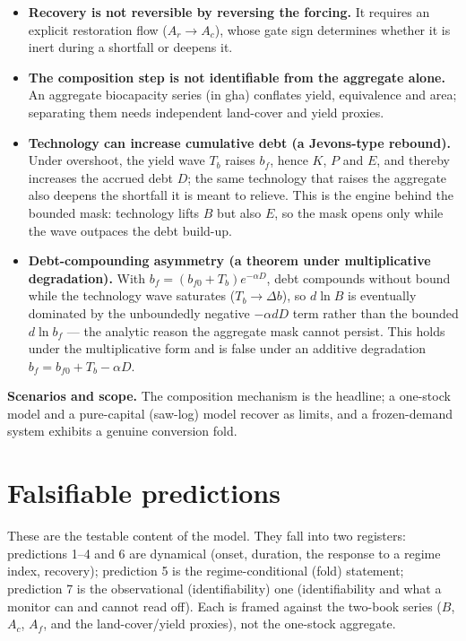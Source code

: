 \documentclass[11pt]{article}
\begin{document}
\begin{itemize}
\item \textbf{Recovery is not reversible by reversing the forcing.} It requires an explicit restoration flow ($A_r\to A_c$), whose gate sign determines whether it is inert during a shortfall or deepens it.
\item \textbf{The composition step is not identifiable from the aggregate alone.} An aggregate biocapacity series (in gha) conflates yield, equivalence and area; separating them needs independent land-cover and yield proxies.
\item \textbf{Technology can increase cumulative debt (a Jevons-type rebound).} Under overshoot, the yield wave $T_b$ raises $b_f$, hence $K$, $P$ and $E$, and thereby increases the accrued debt $D$; the same technology that raises the aggregate also deepens the shortfall it is meant to relieve. This is the engine behind the bounded mask: technology lifts $B$ but also $E$, so the mask opens only while the wave outpaces the debt build-up.
\item \textbf{Debt-compounding asymmetry (a theorem under multiplicative degradation).} With $b_f=(b_{f0}+T_b)e^{-\alpha D}$, debt compounds without bound while the technology wave saturates ($T_b\to\Delta b$), so $d\ln B$ is eventually dominated by the unboundedly negative $-\alpha dD$ term rather than the bounded $d\ln b_f$ --- the analytic reason the aggregate mask cannot persist. This holds under the multiplicative form and is false under an additive degradation $b_f=b_{f0}+T_b-\alpha D$.
\end{itemize}

\noindent\textbf{Scenarios and scope.} The composition mechanism is the headline; a one-stock model and a pure-capital (saw-log) model recover as limits, and a frozen-demand system exhibits a genuine conversion fold.

\section{Falsifiable predictions}

These are the testable content of the model. They fall into two registers: predictions 1--4 and 6 are dynamical (onset, duration, the response to a regime index, recovery); prediction 5 is the regime-conditional (fold) statement; prediction 7 is the observational (identifiability) one (identifiability and what a monitor can and cannot read off). Each is framed against the two-book series ($B$, $A_c$, $A_f$, and the land-cover/yield proxies), not the one-stock aggregate.
\end{document}
